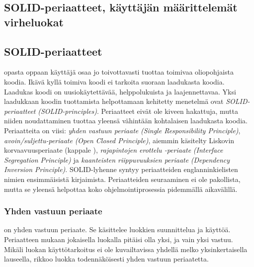 \documentclass[a4paper,justified,notoc]{tufte-book}
\newcommand{\eng}[1]{\textit{(#1)}}
\newcommand{\new}[1]{\textit{\gls{#1}}}
\newcommand{\neweng}[2]{\new{#1} \eng{#2}}
\begin{document}
\begin{fullwidth}

\chapter{SOLID-periaatteet, käyttäjän määrittelemät virheluokat}
\label{solid+exceptions}


\section{SOLID-periaatteet}
\label{solid}

 opasta oppaan käyttäjä osaa jo toivottavasti tuottaa toimivaa
oliopohjaista koodia. Ikävä kyllä toimiva koodi ei tarkoita suoraan laadukasta koodia. Laadukas
koodi on uusiokäytettävää, helppolukuista ja laajennettavaa. Yksi laadukkaan koodin tuottamista
helpottamaan kehitetty menetelmä ovat \neweng{SOLID-periaatteet}{SOLID-principles}. Periaatteet
eivät ole kiveen hakattuja, mutta niiden noudattaminen tuottaa yleensä vähintään kohtalaisen
laadukasta koodia. Periaatteita on viisi: \neweng{yhden vastuun periaate}{Single Responsibility
Principle}, \neweng{avoin/suljettu-periaate}{Open Closed Principle}, aiemmin käsitelty
\gls{Liskovin korvaavuusperiaate} (kappale ), \neweng{rajapintojen erottelu
-periaate}{Interface Segregation Principle} ja \neweng{kaanteisten riippuvuuksien periaate}
{Dependency Inversion Principle}. SOLID-lyhenne syntyy periaatteiden englanninkielisten nimien
ensimmäisistä kirjaimista. Periaatteiden seuraaminen ei ole pakollista, mutta se yleensä helpottaa
koko ohjelmointiprosessia pidemmällä aikavälillä.

\subsection{Yhden vastuun periaate}
\label{SRP}

 on \gls{yhden vastuun periaate}. Se käsittelee luokkien
suunnittelua ja käyttöä. Periaatteen mukaan jokaisella luokalla pitäisi olla yksi, ja vain yksi
vastuu. Mikäli luokan käyttötarkoitus ei ole kuvailtavissa yhdellä melko yksinkertaisella
lauseella, rikkoo luokka todennäköisesti yhden vastuun periaatetta.


\end{fullwidth}
\end{document}
